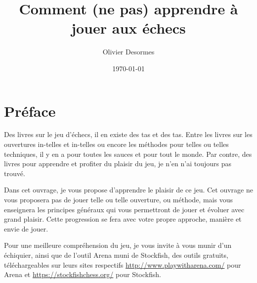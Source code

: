 \documentclass[a5paper,openany,twocolumn]{book}
\begin{document}
 \setcounter{page}{1} 
\frontmatter
\title{Comment (ne pas) apprendre à jouer aux échecs}
\author{Olivier Desormes}
\date{\today}
\maketitle \thispagestyle{empty}

\onecolumn

\newpage
\strut
\newpage

\twocolumn

\tableofcontents \thispagestyle{empty}

\onecolumn

\newpage \thispagestyle{empty}
\strut
\newpage \thispagestyle{empty}

\twocolumn


\onecolumn

\chapter{Préface}\thispagestyle{empty}

Des livres sur le jeu d'échecs, il en existe des tas et des tas. Entre les livres sur les ouvertures in-telles et in-telles ou encore les méthodes pour telles ou telles techniques, il y en a pour toutes les sauces et pour tout le monde. Par contre, des livres pour apprendre et profiter du plaisir du jeu, je n'en n'ai toujours pas trouvé.

Dans cet ouvrage, je vous propose d'apprendre le plaisir de ce jeu. Cet ouvrage ne vous proposera pas de jouer telle ou telle ouverture, ou méthode, mais vous enseignera les principes généraux qui vous permettront de jouer et évoluer avec grand plaisir. Cette progression se fera avec votre propre approche, manière et envie de jouer.

Pour une meilleure compréhension du jeu, je vous invite à vous munir d'un échiquier, ainsi que de l'outil Arena muni de Stockfish, des outils gratuits, téléchargeables sur leurs sites respectifs \href{http://www.playwitharena.com/}{http://www.playwitharena.com/} pour Arena et \href{https://stockfishchess.org/}{https://stockfishchess.org/} pour Stockfish.

\twocolumn

\onecolumn

\newpage \thispagestyle{empty}
\strut
\newpage \thispagestyle{empty}
\end{document}
